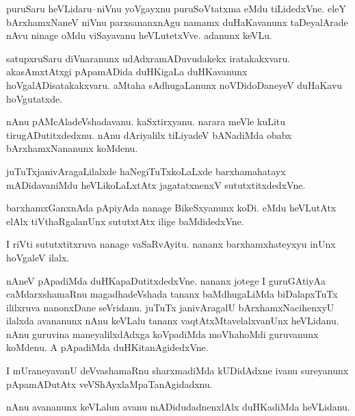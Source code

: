 \documentclass{article}
\begin{document}
\begin{mn}%
puruSaru heVLidaru--niVnu yoVgayxnu puruSoVtatxma eMdu tiLidedxVne. eleY bArxhamxNaneV 
niVnu parxsananxnAgu namamx duHaKavanunx taDeyalArade nAvu ninage oMdu viSayavanu 
heVLutetxVve. adanunx keVLu.
\end{mn}

\begin{mn}%
satupxruSaru diVnaranunx udAdxramADuvudakekx iratakakxvaru. akasAmxtAtxgi pApamADida 
duHKigaLa duHKavanunx hoVgalADisatakakxvaru. aMtaha sAdhugaLanunx noVDidoDaneyeV duHaKavu 
hoVgutatxde.
\end{mn}

\begin{mn}%
nAnu pAMcAladeVshadavanu. kaSxtirxyanu. narara meVle kuLitu tirugADutitxdedxnu. nAnu 
dAriyalilx tiLiyadeV bANadiMda obabx bArxhamxNananunx koMdenu.
\end{mn}

\begin{mn}%
juTuTxjanivAragaLilalxde haNegiTuTxkoLaLxde barxhamahatayx mADidavaniMdu heVLikoLaLxtAtx 
jagatatxnenxV sututxtitxdedxVne.
\end{mn}

\begin{mn}%
barxhamxGanxnAda pApiyAda nanage BikeSxyanunx koDi. eMdu heVLutAtx elAlx tiVthaRgalanUnx 
sututxtAtx ilige baMdidedxVne.
\end{mn}

\begin{mn}%
I riVti sututxtitxruva nanage vaSaRvAyitu. nananx barxhamxhateyxyu inUnx hoVgaleV ilalx.
\end{mn}

\begin{mn}%
nAneV pApadiMda duHKapaDutitxdedxVne. nananx jotege I guruGAtiyAa caMdarxshamaRnu 
magadhadeVshada tananx baMdhugaLiMda biDalapxTuTx ililxruva nanonxDane seVridanu. juTuTx 
janivAragalU bArxhamxNacihenxyU ilalxda avananunx nAnu keVLalu tananx 
vaqtAtxMtavelalxvanUnx heVLidanu. nAnu guruvina maneyalilxdAdxga koVpadiMda moVhahoMdi 
guruvanunx koMdenu. A pApadiMda duHKitanAgidedxVne.
\end{mn}

\begin{mn}%
I mUraneyavanU deVvashamaRnu sharxmadiMda kUDidAdxne ivanu sureyanunx pApamADutAtx 
veVShAyxlaMpaTanAgidadxnu.
\end{mn}

\begin{mn}%
nAnu avananunx keVLalun avanu mADidudadnenxlAlx duHKadiMda heVLidanu.
\end{mn}
\end{document}
